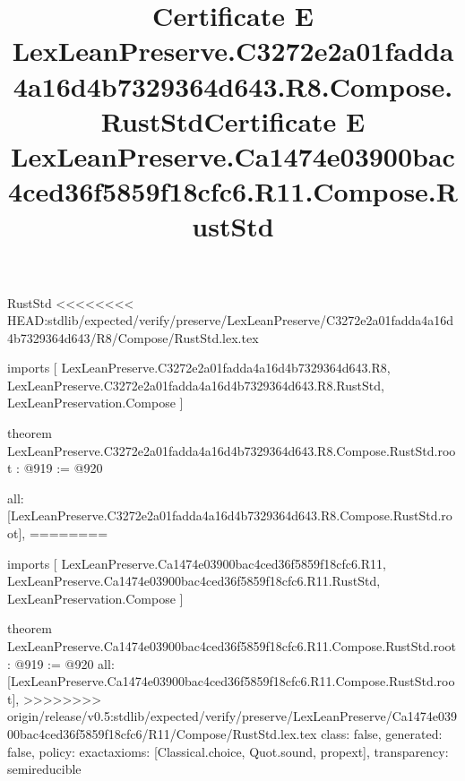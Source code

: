 \begin{lexlean}{RustStd}
<<<<<<<< HEAD:stdlib/expected/verify/preserve/LexLeanPreserve/C3272e2a01fadda4a16d4b7329364d643/R8/Compose/RustStd.lex.tex
\title{Certificate E LexLeanPreserve.C3272e2a01fadda4a16d4b7329364d643.R8.Compose.RustStd}
\begin{coremodule}
imports [
  LexLeanPreserve.C3272e2a01fadda4a16d4b7329364d643.R8,
  LexLeanPreserve.C3272e2a01fadda4a16d4b7329364d643.R8.RustStd,
  LexLeanPreservation.Compose
]

theorem LexLeanPreserve.C3272e2a01fadda4a16d4b7329364d643.R8.Compose.RustStd.root : @919 := @920 {
  all: [LexLeanPreserve.C3272e2a01fadda4a16d4b7329364d643.R8.Compose.RustStd.root],
========
\title{Certificate E LexLeanPreserve.Ca1474e03900bac4ced36f5859f18cfc6.R11.Compose.RustStd}
\begin{coremodule}
imports [
  LexLeanPreserve.Ca1474e03900bac4ced36f5859f18cfc6.R11,
  LexLeanPreserve.Ca1474e03900bac4ced36f5859f18cfc6.R11.RustStd,
  LexLeanPreservation.Compose
]

theorem LexLeanPreserve.Ca1474e03900bac4ced36f5859f18cfc6.R11.Compose.RustStd.root : @919 := @920 {
  all: [LexLeanPreserve.Ca1474e03900bac4ced36f5859f18cfc6.R11.Compose.RustStd.root],
>>>>>>>> origin/release/v0.5:stdlib/expected/verify/preserve/LexLeanPreserve/Ca1474e03900bac4ced36f5859f18cfc6/R11/Compose/RustStd.lex.tex
  class: false,
  generated: false,
  policy: exact{axioms: [Classical.choice, Quot.sound, propext]},
  transparency: semireducible
}


\end{coremodule}}
\end{coremodule}
\end{lexlean}
